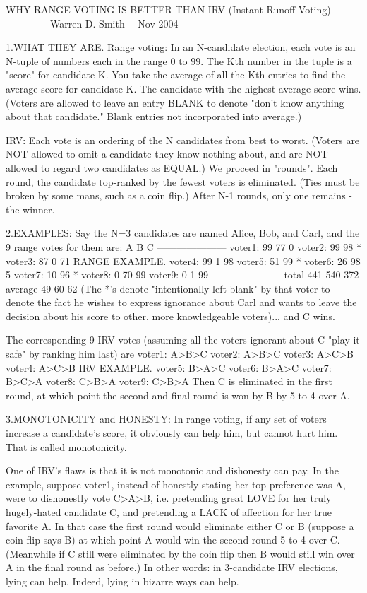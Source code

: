 WHY RANGE VOTING IS BETTER THAN IRV (Instant Runoff Voting)
--------------Warren D. Smith----Nov 2004------------------


1.WHAT THEY ARE.
Range voting: In an N-candidate election, each vote
is an N-tuple of numbers each in the range 0 to 99.
The Kth number in the tuple is a "score" for candidate K.
You take the average of all the Kth entries to find
the average score for candidate K.  The candidate
with the highest average score wins.
(Voters are allowed to leave an entry BLANK to denote
"don't know anything about that candidate."  Blank entries
not incorporated into average.)

IRV: Each vote is an ordering of the N candidates
from best to worst.  (Voters are NOT allowed to omit a
candidate they know nothing about, and are NOT allowed
to regard two candidates as EQUAL.)
We proceed in "rounds".  Each round, the candidate top-ranked
by the fewest voters is eliminated.  (Ties must be broken by some
mans, such as a coin flip.)  After N-1 rounds, only
one remains - the winner.

2.EXAMPLES:
Say the N=3 candidates are named Alice, Bob, and Carl,
and the 9 range votes for them are:
           A   B   C
---------------------
voter1:   99  77   0
voter2:   99  98   *
voter3:   87   0  71       RANGE EXAMPLE.
voter4:   99   1  98
voter5:   51  99   *
voter6:   26  98   5
voter7:   10  96   *
voter8:    0  70  99
voter9:    0   1  99
---------------------
total    441 540 372
average   49  60  62
(The *'s denote "intentionally left blank" by that voter
to denote the fact he wishes to express ignorance about Carl and
wants to leave the decision about his score to other, more knowledgeable
voters)... and C wins.

The corresponding 9 IRV votes (assuming all the voters ignorant
about C "play it safe" by ranking him last) are
voter1:   A>B>C
voter2:   A>B>C
voter3:   A>C>B
voter4:   A>C>B       IRV EXAMPLE.
voter5:   B>A>C
voter6:   B>A>C
voter7:   B>C>A
voter8:   C>B>A
voter9:   C>B>A
Then C is eliminated in the first round, at which point the second and
final round is won by B by 5-to-4 over A.

3.MONOTONICITY and HONESTY:
In range voting, if any set of voters increase a candidate's score,
it obviously can help him, but cannot hurt him.  That is called monotonicity.

One of IRV's flaws is that it is not monotonic and dishonesty can pay.
In the example, suppose voter1, instead of honestly stating
her top-preference was A, were to dishonestly vote C>A>B,
i.e. pretending great LOVE for her truly hugely-hated candidate C,
and pretending a LACK of affection for her true favorite A.
In that case the first round would eliminate either C or B
(suppose a coin flip says B) at which point A would win the
second round 5-to-4 over C.  (Meanwhile if C still were eliminated
by the coin flip then B would still win over A in the final
round as before.)
In other words: in 3-candidate IRV elections, lying can help. 
Indeed, lying in bizarre ways can help.

